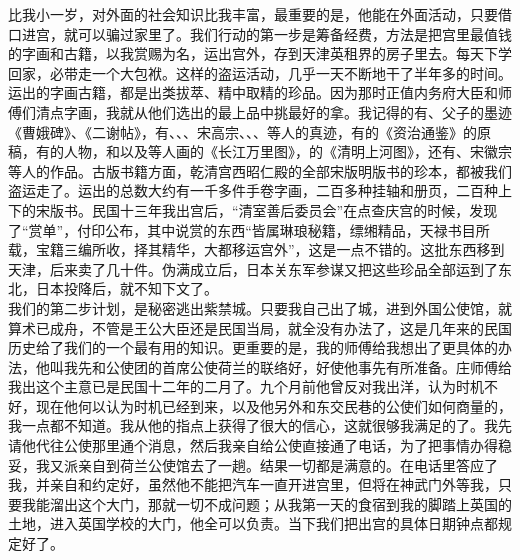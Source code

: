 比我小一岁，对外面的社会知识比我丰富，最重要的是，他能在外面活动，只要借口进宫，就可以骗过家里了。我们行动的第一步是筹备经费，方法是把宫里最值钱的字画和古籍，以我赏赐为名，运出宫外，存到天津英租界的房子里去。每天下学回家，必带走一个大包袱。这样的盗运活动，几乎一天不断地干了半年多的时间。运出的字画古籍，都是出类拔萃、精中取精的珍品。因为那时正值内务府大臣和师傅们清点字画，我就从他们选出的最上品中挑最好的拿。我记得的有、父子的墨迹《曹娥碑》、《二谢帖》，有、、、宋高宗、、、等人的真迹，有的《资治通鉴》的原稿，有的人物，和以及等人画的《长江万里图》，的《清明上河图》，还有、宋徽宗等人的作品。古版书籍方面，乾清宫西昭仁殿的全部宋版明版书的珍本，都被我们盗运走了。运出的总数大约有一千多件手卷字画，二百多种挂轴和册页，二百种上下的宋版书。民国十三年我出宫后，“清室善后委员会”在点查庆宫的时候，发现了“赏单”，付印公布，其中说赏的东西“皆属琳琅秘籍，缥缃精品，天禄书目所载，宝籍三编所收，择其精华，大都移运宫外”，这是一点不错的。这批东西移到天津，后来卖了几十件。伪满成立后，日本关东军参谋又把这些珍品全部运到了东北，日本投降后，就不知下文了。\\

我们的第二步计划，是秘密逃出紫禁城。只要我自己出了城，进到外国公使馆，就算术已成舟，不管是王公大臣还是民国当局，就全没有办法了，这是几年来的民国历史给了我们的一个最有用的知识。更重要的是，我的师傅给我想出了更具体的办法，他叫我先和公使团的首席公使荷兰的联络好，好使他事先有所准备。庄师傅给我出这个主意已是民国十二年的二月了。九个月前他曾反对我出洋，认为时机不好，现在他何以认为时机已经到来，以及他另外和东交民巷的公使们如何商量的，我一点都不知道。我从他的指点上获得了很大的信心，这就很够我满足的了。我先请他代往公使那里通个消息，然后我亲自给公使直接通了电话，为了把事情办得稳妥，我又派亲自到荷兰公使馆去了一趟。结果一切都是满意的。在电话里答应了我，并亲自和约定好，虽然他不能把汽车一直开进宫里，但将在神武门外等我，只要我能溜出这个大门，那就一切不成问题；从我第一天的食宿到我的脚踏上英国的土地，进入英国学校的大门，他全可以负责。当下我们把出宫的具体日期钟点都规定好了。\\

